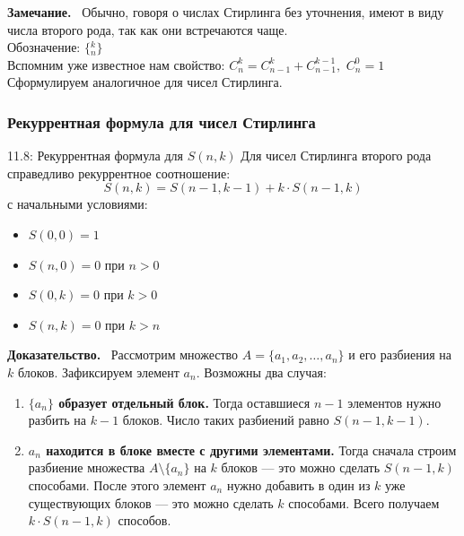 \documentclass[a4paper,12pt]{article}
\newcommand{\myproof}{\textbf{Доказательство.}\ }
\newcommand{\myremark}{\textbf{Замечание.}\ }
\begin{document}
	\myremark{ Обычно, говоря о числах Стирлинга без уточнения, имеют в виду числа второго рода, так как они встречаются чаще. \\
	
	Обозначение: $\{{}_n^k\}$\\
	
	Вспомним уже известное нам свойство: $C_n^k=C_{n-1}^k+C_{n-1}^{k-1},$ $C_n^0=1$\\
	
	Сформулируем аналогичное для чисел Стирлинга.}
	
	\subsubsection{Рекуррентная формула для чисел Стирлинга}
	
	\begin{theorembox}{11.8: Рекуррентная формула для \(S{(n,k)}\)}
		Для чисел Стирлинга второго рода справедливо рекуррентное соотношение:
		\[ S(n, k) = S(n-1, k-1) + k \cdot S(n-1, k) \]
		с начальными условиями:
		\begin{itemize}
			\item \(S(0,0) = 1\)
			\item \(S(n,0) = 0\) при \(n > 0\)
			\item \(S(0,k) = 0\) при \(k > 0\)
			\item \(S(n,k) = 0\) при \(k > n\)
		\end{itemize}
	\end{theorembox}
	
	\myproof
	Рассмотрим множество \(A = \{a_1, a_2, \dots, a_n\}\) и его разбиения на \(k\) блоков. Зафиксируем элемент \(a_n\). Возможны два случая:
	
	\begin{enumerate}
		\item \textbf{\(\{a_n\}\) образует отдельный блок.} Тогда оставшиеся \(n-1\) элементов нужно разбить на \(k-1\) блоков. Число таких разбиений равно \(S(n-1, k-1)\).
		
		\item \textbf{\(a_n\) находится в блоке вместе с другими элементами.} Тогда сначала строим разбиение множества \(A \setminus \{a_n\}\) на \(k\) блоков — это можно сделать \(S(n-1, k)\) способами. После этого элемент \(a_n\) нужно добавить в один из \(k\) уже существующих блоков — это можно сделать \(k\) способами. Всего получаем \(k \cdot S(n-1, k)\) способов.
	\end{enumerate}
	
\end{document}
